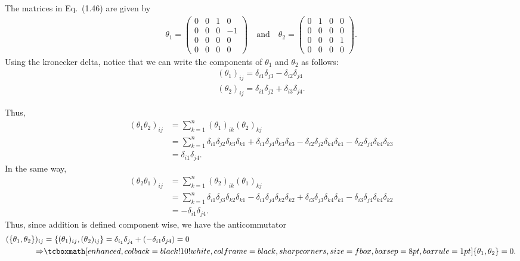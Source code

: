 
The matrices in Eq.~(1.46) are given by
\begin{eqnarray}
    \label{eq:matrices-1.46}
    \theta_1 = 
    \begin{pmatrix}
    0 & 0 & 1 & 0 \\
    0 & 0 & 0 & -1 \\
    0 & 0 & 0 & 0 \\
    0 & 0 & 0 & 0
    \end{pmatrix}
    \quad
    \mbox{and}
    \quad
    \theta_2 = 
    \begin{pmatrix}
        0 & 1 & 0 & 0 \\
        0 & 0 & 0 & 0 \\
        0 & 0 & 0 & 1 \\
        0 & 0 & 0 & 0
    \end{pmatrix}
.\end{eqnarray}
Using the kronecker delta, notice that we can write the components of $\theta_1$ and $\theta_2$ as follows:
\begin{eqnarray}
    \label{eq:components-th12}
    (\theta_1)_{ij} = \delta_{i 1}\delta_{j 3} - \delta_{i 2}\delta_{j 4} \\
    (\theta_2)_{ij} = \delta_{i 1}\delta_{j 2} + \delta_{i 3}\delta_{j 4}
.\end{eqnarray}

Thus,
\begin{align}
    \label{eq:th1-th2-prod}
    (\theta_1\theta_2)_{ij} &= \sum_{k=1}^{n} (\theta_1)_{ik}(\theta_2)_{kj} \\
                            &= \sum_{k=1}^{n} \delta_{i 1}\delta_{j 2}\delta_{k 3}\delta_{k 1} + \delta_{i 1}\delta_{j 4}\delta_{k 3}\delta_{k 3} - \delta_{i 2}\delta_{j 2}\delta_{k 4}\delta_{k 1} - \delta_{i 2}\delta_{j 4}\delta_{k 4}\delta_{k 3} \\
                            &= \delta_{i 1}\delta_{j 4}
.\end{align}
In the same way,
\begin{align}
    \label{eq:th2-th1-prod}
    (\theta_2\theta_1)_{ij} &= \sum_{k=1}^{n} (\theta_2)_{ik}(\theta_1)_{kj} \\
                            &= \sum_{k=1}^{n} \delta_{i 1}\delta_{j 3}\delta_{k 2}\delta_{k 1} - \delta_{i 1}\delta_{j 4}\delta_{k 2}\delta_{k 2} + \delta_{i 3}\delta_{j 3}\delta_{k 4}\delta_{k 1} - \delta_{i 3}\delta_{j 4}\delta_{k 4}\delta_{k 2} \\
                            &= -\delta_{i 1}\delta_{j 4}
.\end{align}
Thus, since addition is defined component wise, we have the anticommutator
\begin{align}
    \label{eq:anticommutator}
    (\{\theta_1,\theta_2\})_{ij} &= \{(\theta_1)_{ij},(\theta_2)_{ij}\} = \delta_{i_1}\delta_{j_4} + (-\delta_{i 1}\delta_{j 4}) = 0 \\
    \Rightarrow& \eqbox{\{\theta_1,\theta_2\} = 0}
.\end{align}


